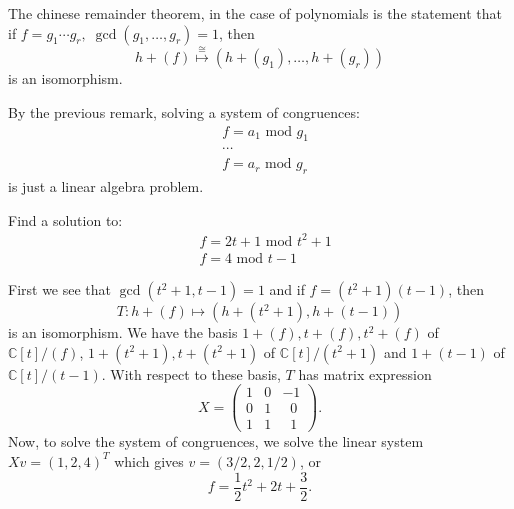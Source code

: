 \begin{dang}
    \begin{remark}
        The chinese remainder theorem, in the case of polynomials is the statement that 
         if $f=g_1\cdots g_r,\;\gcd(g_1,\dots,g_r)=1$, then 
        \begin{equation}
            h+(f) \overset{\cong}{\longmapsto} (h+(g_1),\dots,h+(g_r))
        \end{equation}
        is an isomorphism.
    \end{remark}
\end{dang}
By the previous remark, solving a system of congruences:
\begin{equation}
    \begin{split}
        &f = a_1 \text{ mod } g_1\\
        &\cdots\\
        &f = a_r \text{ mod } g_r
    \end{split}
\end{equation}
is just a linear algebra problem.
\begin{dang}
    \begin{example}
      Find a solution to:
      \begin{equation}
        \begin{split}
            &f = 2t+1\text{ mod }t^2+1\\
            &f = 4 \text{ mod } t-1
        \end{split}
      \end{equation}
    \end{example}
\end{dang}
First we see that $\gcd(t^2+1,t-1)=1$ and if $f=(t^2+1)(t-1)$, then
\begin{equation}
   T: h+(f)\mapsto (h+(t^2+1),h+(t-1))
\end{equation}
is an isomorphism. We have the basis $1+(f),t+(f),t^2+(f)$ of $\mathbb{C}[t]/(f)$, $1+(t^2+1),t+(t^2+1)$ of 
$\mathbb{C}[t]/(t^2+1)$ and $1+(t-1)$ of $\mathbb{C}[t]/(t-1)$. With respect to these basis, $T$ has matrix expression
\begin{equation}
   X= \begin{pmatrix}
        1&0&-1\\ 0&1&\;\;0\\ 1&1&\;\;1
    \end{pmatrix}.
\end{equation}
Now, to solve the system of congruences, we solve the linear system $Xv=(1,2,4)^T$ which gives $v=(3/2,2,1/2)$, or 
\begin{equation}
    f = \frac12 t^2+2t+\frac32.
\end{equation}


